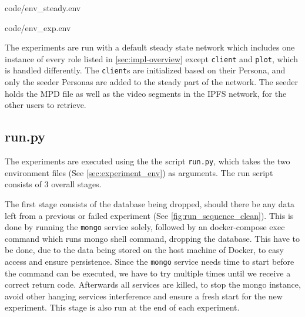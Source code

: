 \noindent\begin{minipage}[t]{.35\textwidth}

                {code/env_steady.env}
\end{minipage}
\hfill
\begin{minipage}[t]{.52\textwidth}

                {code/env_exp.env}
\end{minipage}\bigskip

The experiments are run with a default steady state network which includes one instance of every role listed in \autoref{sec:impl-overview} except \texttt{client} and \texttt{plot}, which is handled differently. The \texttt{client}s are initialized based on their Persona, and only the seeder Personas are added to the steady part of the network.
The seeder holds the \ac{MPD} file as well as the video segments in the \ac{IPFS} network, for the other users to retrieve. 

\subsection{run.py}
\label{sec:experiment_run}
The experiments are executed using the the script \texttt{run.py}, which takes the two environment files (See \autoref{sec:experiment_env}) as arguments. The run script consists of 3 overall stages.

The first stage consists of the database being dropped, should there be any data left from a previous or failed experiment (See \autoref{fig:run_sequence_clean}). This is done by running the \texttt{mongo} service solely, followed by an docker-compose exec command which runs mongo shell command, dropping the database. This have to be done, due to the data being stored on the host machine of Docker, to easy access and ensure persistence. Since the \texttt{mongo} service needs time to start before the command can be executed, we have to try multiple times until  we receive a correct return code. Afterwards all services are killed, to stop the mongo instance, avoid other hanging services interference and ensure a fresh start for the new experiment. This stage is also run at the end of each experiment.




